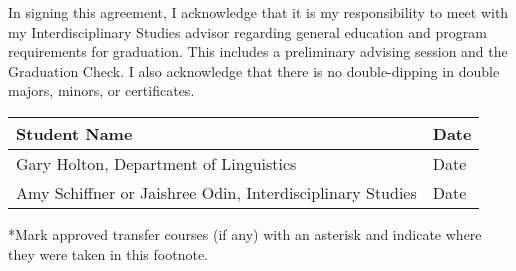 \documentclass[11pt,oneside]{article}
\begin{document}
\vfill
In signing this agreement, I acknowledge that it is my responsibility to meet with my Interdisciplinary Studies advisor regarding general education and program requirements for graduation.  This includes a preliminary advising session and the Graduation Check. I also acknowledge that there is no double-dipping in double majors, minors, or certificates.\\[1em]


\begin{table}[h]
    \centering
    \begin{tabular*}{\textwidth}{p{12cm}p{3cm}}
        \hline
         Student Name & Date  \\[2em]
         \hline
         Gary Holton, Department of Linguistics & Date \\[2em]
         \hline
        Amy Schiffner or Jaishree Odin, Interdisciplinary Studies  & Date \\[1em]
    \end{tabular*}
\end{table}


\vspace{1cm}
*Mark approved transfer courses (if any) with an asterisk and indicate where they were taken in this footnote. 
\end{document}
